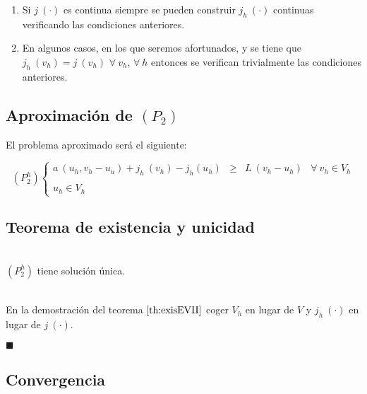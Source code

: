 \begin{enumerate}
\item Si $j\ (\cdot )$ es continua siempre se pueden construir $j_h\ (\cdot )$
continuas verificando las condiciones anteriores.
\item En algunos casos, en los que seremos afortunados, y se tiene que
$j_h\ (v_h) = j\ (v_h)$ $\forall \ v_h$, $\forall \ h$ entonces se verifican
trivialmente las condiciones anteriores.
\end{enumerate}

\subsection{Aproximaci\'on de $(P_2)$}

El problema aproximado ser\'a el siguiente:

\begin{equation}
(P_2^h) \left\{ \begin{array}{lrlr}
a\ (u_h,v_h-u_u)+j_h\ (v_h)-j_h (u_h)&\ge &L\ (v_h-u_h) &\forall \ v_h \in V_h \\
\\
u_h \in V_h
\end{array} \right.
\end{equation}

\subsection{Teorema de existencia y unicidad}

\begin{teorema}
\ \\
$(P_2^h)$ tiene soluci\'on \'unica.
\end{teorema}

\begin{demosteorema}
\ \\
En la demostraci\'on del teorema $\ref{th:exisEVII}$ coger $V_h$ en lugar de $V$
y $j_h\ (\cdot )$ en lugar de $j\ (\cdot )$.

\begin{flushright}
$\blacksquare$
\end{flushright}
\end{demosteorema}

\newpage

\subsection{Convergencia}

